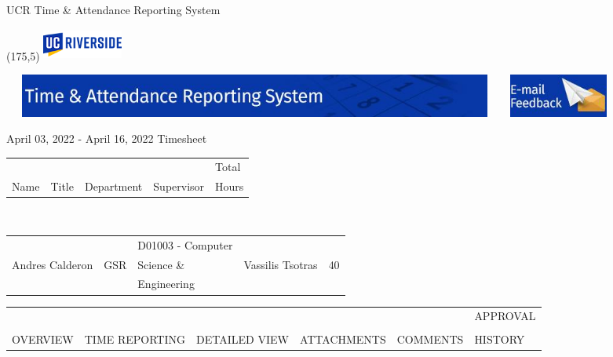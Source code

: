 \documentclass{article}
\begin{document}
\vspace{0.5cm}
\begin{center}
UCR Time \& Attendance Reporting System
\end{center}

\begin{textblock}{20}(175,5)
    \includegraphics[width=75pt,height=30pt]{latexImage_7fbf2b7b584b6a1336a02995be0fda2e.png}
\end{textblock}

\noindent \includegraphics[width=475pt,height=40pt]{latexImage_27cdb919c08fde06af0ea4f32e9b0b4a.png}\includegraphics[width=105pt,  height=40pt]{latexImage_4bdc976671d95a1b7e024dfbd0cca2f2.png}

\begin{center}
    April 03, 2022 - April 16, 2022 Timesheet
    \begin{tabular}{  C{4cm}  C{2cm} C{4cm} C{4cm} C{2cm}  }
        & & & & Total \\
        Name & Title & Department & Supervisor & Hours \\
    \end{tabular} \\
    {
        \setlength\arrayrulewidth{1.5pt}
    \begin{tabular}{  | C{4cm} | C{2cm} | C{4cm} | C{4cm} | C{2cm} | }
            \hline
            & & \small D01003 - Computer & & \\
            Andres Calderon & GSR & \small Science \& & Vassilis Tsotras & 40 \\
            & & \small Engineering & & \\
            \hline
        \end{tabular}
    } 
\end{center}

\vspace{0.5cm}
{
    \fontsize{6}{1}\selectfont
    \begin{tabularx}{0.8\textwidth}{  X  X  X  X  X  X  }
        & & & & & APPROVAL \\ \\
        OVERVIEW & TIME REPORTING & DETAILED VIEW & ATTACHMENTS & COMMENTS & HISTORY \\
    \end{tabularx}
}
\end{document}
